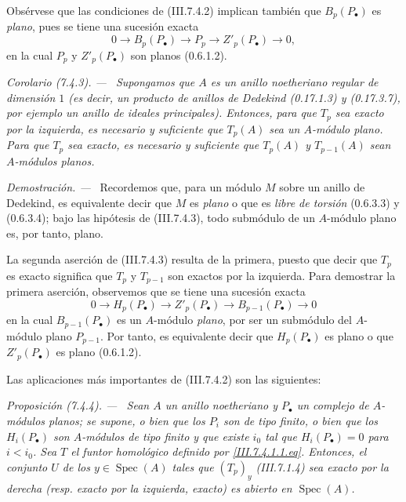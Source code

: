 \documentclass[10pt,oneside]{book}
\newcommand{\Spec}{\operatorname{Spec}}
\newcommand{\sref}[2][]{\textup{(#2)}}
\newenvironment{proposition}[1][]{\par\medskip\noindent\itshape Proposición (#1). ---\ }{\par}
\newenvironment{corollary}[1][]{\par\medskip\noindent\itshape Corolario (#1). ---\ }{\par}
\newenvironment{proof}{\par\medskip\noindent\textit{Demostración. ---\ }}{\par}
\begin{document}
Obsérvese que las condiciones de \sref{III.7.4.2} implican también que
$B_p(P_\bullet)$ es \emph{plano}, pues se tiene una sucesión exacta
\[
  0\longrightarrow B_p(P_\bullet)\longrightarrow P_p
  \longrightarrow Z'_p(P_\bullet)\longrightarrow0,
\]
en la cual $P_p$ y $Z'_p(P_\bullet)$ son planos
\sref[0]{0.6.1.2}.

\begin{corollary}[7.4.3]
\label{III.7.4.3}
Supongamos que $A$ es un anillo noetheriano regular de dimensión $1$ \textup{(es
decir, un \emph{producto de anillos de Dedekind} \sref[0]{0.17.1.3} y
\sref[0]{0.17.3.7}, por ejemplo un anillo \emph{de ideales principales})}. Entonces,
para que $T_p$ sea exacto por la izquierda, es necesario y suficiente que
$T_p(A)$ sea un $A$-módulo plano. Para que $T_p$ sea exacto, es necesario y
suficiente que $T_p(A)$ y $T_{p-1}(A)$ sean $A$-módulos planos.
\end{corollary}

\begin{proof}
Recordemos que, para un módulo $M$ sobre un anillo de Dedekind, es equivalente
decir que $M$ es \emph{plano} o que es \emph{libre de torsión} \sref[0]{0.6.3.3} y
\sref[0]{0.6.3.4}; bajo las hipótesis de \sref{III.7.4.3}, todo submódulo de un
$A$-módulo plano es, por tanto, plano.

La segunda aserción de \sref{III.7.4.3} resulta de la primera, puesto que decir
que $T_p$ es exacto significa que $T_p$ y $T_{p-1}$ son exactos por la
izquierda. Para demostrar la primera aserción, observemos que se tiene una
sucesión exacta
\[
  0\longrightarrow H_p(P_\bullet)\longrightarrow Z'_p(P_\bullet)
  \longrightarrow B_{p-1}(P_\bullet)\longrightarrow0
\]
en la cual $B_{p-1}(P_\bullet)$ es un $A$-módulo \emph{plano}, por ser un submódulo
del $A$-módulo plano $P_{p-1}$. Por tanto, es equivalente decir que
$H_p(P_\bullet)$ es plano o que $Z'_p(P_\bullet)$ es plano
\sref[0]{0.6.1.2}.
\end{proof}

Las aplicaciones más importantes de \sref{III.7.4.2} son las siguientes:

\begin{proposition}[7.4.4]
\label{III.7.4.4}
Sean $A$ un anillo noetheriano y $P_\bullet$ un complejo de $A$-módulos
planos; se supone, o bien que los $P_i$ son de tipo finito, o bien que los
$H_i(P_\bullet)$ son $A$-módulos de tipo finito y que existe $i_0$ tal que
$H_i(P_\bullet)=0$ para $i<i_0$. Sea $T$ el funtor homológico definido por
\eqref{III.7.4.1.1.eq}. Entonces, el conjunto $U$ de los
$y\in\Spec(A)$ tales que $(T_p)_y$ \sref{III.7.1.4} sea exacto por la derecha
\textup{(resp. \emph{exacto por la izquierda, exacto})} es abierto en $\Spec(A)$.
\end{proposition}
\end{document}
